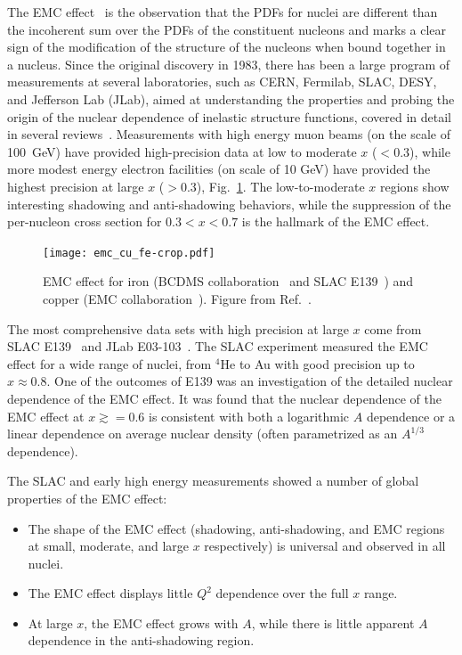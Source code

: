 The EMC effect~\cite{Aubert:1983xm} is the observation that the PDFs for nuclei are different than
the incoherent sum over the PDFs of the constituent nucleons and marks a clear sign of the modification
of the structure of the nucleons when bound together in a nucleus.
Since the original discovery in 1983, there has been a large
program of measurements at several laboratories, such as CERN, Fermilab, SLAC, DESY, and Jefferson Lab (JLab),
aimed at understanding the properties and probing the origin of the nuclear dependence of inelastic
structure functions, covered in detail in several reviews~\cite{Geesaman:1995yd, Malace:2014uea, Hen:2016kwk}.
Measurements with high energy muon beams (on the scale of 100~GeV) have provided high-precision data at low to
moderate $x$ ($<0.3$), while more modest energy electron facilities (on scale of 10 GeV) have provided
the highest precision at large $x$ ($>0.3$), Fig.~\ref{fig:emc_iron}.  The low-to-moderate $x$
regions show interesting shadowing and anti-shadowing behaviors, while the suppression of the
per-nucleon cross section for $0.3<x<0.7$ is the hallmark of the EMC effect.

\begin{figure}[tbp]
  \centering\texttt{[image: emc\_cu\_fe-crop.pdf]}
  \caption{EMC effect for iron (BCDMS collaboration~\cite{Benvenuti:1987az} and SLAC E139~\cite{Gomez:1993ri})
    and copper (EMC collaboration~\cite{Ashman:1992kv}).
    Figure from Ref.~\cite{Guzey:2012yk}.}
  \label{fig:emc_iron}
\end{figure}

The most comprehensive data sets with high precision at large $x$ come from SLAC E139~\cite{Gomez:1993ri} and JLab E03-103~\cite{Seely:2009gt}. The SLAC experiment
measured the EMC effect for a wide range of nuclei, from $^4$He to Au with good precision up to
$x\approx0.8$.  One of the outcomes of E139 was an investigation of the detailed nuclear dependence of the EMC
effect. It was found that the nuclear dependence of the EMC effect at $x \gtrsim =0.6$ is consistent
with both a logarithmic $A$ dependence or a linear dependence on average nuclear density (often parametrized as an $A^{1/3}$ dependence).

The SLAC and early high energy measurements showed a number of global properties of the EMC effect:
\begin{itemize}
 \item{The shape of the EMC effect (shadowing, anti-shadowing, and EMC regions at small, moderate, and
  large $x$ respectively) is universal and observed in all nuclei.}
 \item{The EMC effect displays little $Q^2$ dependence over the full $x$ range.}
 \item{At large $x$, the EMC effect grows with $A$, while there is little apparent $A$ dependence in the
   anti-shadowing region.}
\end{itemize}

